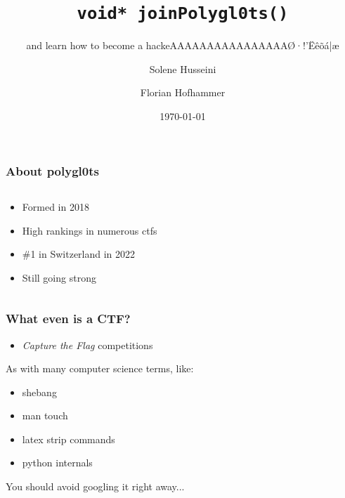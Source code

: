 \documentclass[aspectratio=169]{beamer}
\title{\texttt{void* joinPolygl0ts()}}
\subtitle{and learn how to become a hackeAAAAAAAAAAAAAAAAØ·!'Ëêõá|æ}
\author{Solene Husseini \and Florian Hofhammer}
\date{\today}
\begin{document}
  
\titleframe

\begin{frame}
    \frametitle{About polygl0ts}
    \begin{columns}
        \begin{column}{0.5\textwidth}
            \begin{itemize}
                \item Formed in 2018
				\item High rankings in numerous ctfs
				\item \#1 in Switzerland in 2022
				\item Still going strong
            \end{itemize}
        \end{column}
        \begin{column}{0.5\textwidth}
            
        \end{column}
    \end{columns}
\end{frame}

\begin{frame}
	\frametitle{What even is a CTF?}
	\begin{itemize}
		\item \textit{Capture the Flag} competitions
	\end{itemize}
	\pause
	\vspace{2em}
	As with many computer science terms, like:
	\begin{itemize}
		\item shebang
		\item man touch
		\item latex strip commands
		\item python internals
	\end{itemize}
	You should avoid googling it right away...
\end{frame}
\end{document}
